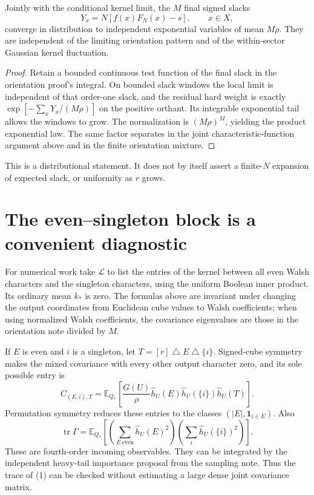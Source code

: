 \documentclass[11pt]{article}
\newcommand{\E}{\mathbb E}\newcommand{\R}{\mathbb R}
\begin{document}
\begin{corollary}
Jointly with the conditional kernel limit, the $M$ final signed slacks
\[
              Y_x=N[f(x)F_N(x)-s],\qquad x\in X,
\]
converge in distribution to independent exponential variables of mean
$M\rho$. They are independent of the limiting orientation pattern and
of the within-sector Gaussian kernel fluctuation.
\end{corollary}
\begin{proof}
Retain a bounded continuous test function of the final slack in the
orientation proof's integral. On bounded slack windows the local limit
is independent of that order-one slack, and the residual hard weight
is exactly $\exp[-\sum_xY_x/(M\rho)]$ on the positive orthant.
Its integrable exponential tail allows the windows to grow. The
normalization is $(M\rho)^M$, yielding the product exponential law.
The same factor separates in the joint characteristic-function argument
above and in the finite orientation mixture.
\end{proof}
This is a distributional statement. It does not by itself assert a
finite-$N$ expansion of expected slack, or uniformity as $r$ grows.

\section{The even--singleton block is a convenient diagnostic}
For numerical work take $\mathcal L$ to list the entries of the kernel
between all even Walsh characters and the singleton characters, using
the uniform Boolean inner product. Its ordinary mean $k_*$ is zero.
The formulas above are invariant under changing the output coordinates
from Euclidean cube values to Walsh coefficients; when using normalized
Walsh coefficients, the covariance eigenvalues are those in the
orientation note divided by $M$.

If $E$ is even and $i$ is a singleton, let
$T=[r]\mathbin\triangle E\mathbin\triangle\{i\}$. Signed-cube
symmetry makes the mixed covariance with every other output character
zero, and its sole possible entry is
\[
 C_{(E,i),T}=\E_{Q_*}
  \left[\frac{G(U)}\rho\widehat h_U(E)
                      \widehat h_U(\{i\})\widehat h_U(T)\right].
\]
Permutation symmetry reduces these entries to the classes
$(|E|,\mathbf1_{i\in E})$. Also
\[
 \operatorname{tr}\Gamma=
 \E_{Q_*}\left[
       \left(\sum_{E\ \mathrm{even}}\widehat h_U(E)^2\right)
       \left(\sum_i\widehat h_U(\{i\})^2\right)\right].
\]
These are fourth-order incoming observables. They can be integrated by
the independent heavy-tail importance proposal from the sampling note.
Thus the trace of (1) can be checked without estimating a large dense
joint covariance matrix.
\end{document}
